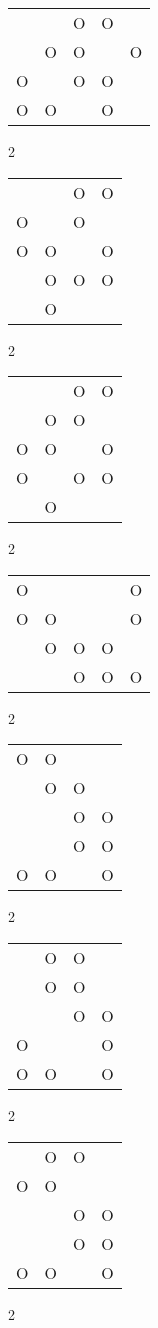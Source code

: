 \begin{tabular}{|m{0.2cm}m{0.2cm}m{0.2cm}m{0.2cm}m{0.2cm}|}\hline
 & &O&O& \\
 &O&O& &O\\
O& &O&O& \\
O&O& &O& \\
\hline\end{tabular}2
\begin{tabular}{|m{0.2cm}m{0.2cm}m{0.2cm}m{0.2cm}|}\hline
 & &O&O\\
O& &O& \\
O&O& &O\\
 &O&O&O\\
 &O& & \\
\hline\end{tabular}2
\begin{tabular}{|m{0.2cm}m{0.2cm}m{0.2cm}m{0.2cm}|}\hline
 & &O&O\\
 &O&O& \\
O&O& &O\\
O& &O&O\\
 &O& & \\
\hline\end{tabular}2
\begin{tabular}{|m{0.2cm}m{0.2cm}m{0.2cm}m{0.2cm}m{0.2cm}|}\hline
O& & & &O\\
O&O& & &O\\
 &O&O&O& \\
 & &O&O&O\\
\hline\end{tabular}2
\begin{tabular}{|m{0.2cm}m{0.2cm}m{0.2cm}m{0.2cm}|}\hline
O&O& & \\
 &O&O& \\
 & &O&O\\
 & &O&O\\
O&O& &O\\
\hline\end{tabular}2
\begin{tabular}{|m{0.2cm}m{0.2cm}m{0.2cm}m{0.2cm}|}\hline
 &O&O& \\
 &O&O& \\
 & &O&O\\
O& & &O\\
O&O& &O\\
\hline\end{tabular}2
\begin{tabular}{|m{0.2cm}m{0.2cm}m{0.2cm}m{0.2cm}|}\hline
 &O&O& \\
O&O& & \\
 & &O&O\\
 & &O&O\\
O&O& &O\\
\hline\end{tabular}2
